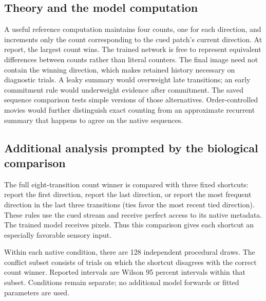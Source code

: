 \documentclass[11pt]{article}
\begin{document}
\subsection{Theory and the model computation}
A useful reference computation maintains four counts, one for each direction, and increments only the count corresponding to the cued patch’s current direction. At report, the largest count wins. The trained network is free to represent equivalent differences between counts rather than literal counters. The final image need not contain the winning direction, which makes retained history necessary on diagnostic trials. A leaky summary would overweight late transitions; an early commitment rule would underweight evidence after commitment. The saved sequence comparison tests simple versions of those alternatives. Order-controlled movies would further distinguish exact counting from an approximate recurrent summary that happens to agree on the native sequences.

\subsection{Additional analysis prompted by the biological comparison}
The full eight-transition count winner is compared with three fixed shortcuts: report the first direction, report the last direction, or report the most frequent direction in the last three transitions (ties favor the most recent tied direction). These rules use the cued stream and receive perfect access to its native metadata. The trained model receives pixels. Thus this comparison gives each shortcut an especially favorable sensory input.

Within each native condition, there are 128 independent procedural draws. The conflict subset consists of trials on which the shortcut disagrees with the correct count winner. Reported intervals are Wilson 95 percent intervals within that subset. Conditions remain separate; no additional model forwards or fitted parameters are used.
\end{document}
